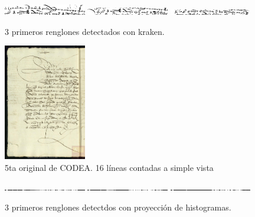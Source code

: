 \documentclass[11pt,a4paper]{article}
\begin{document}
\begin{figure}[H] 
\centering 
\begin{minipage}{1.0\textwidth} 
\includegraphics[width=0.32\textwidth]{4_CODEA_1_kraken.png} 
\includegraphics[width=0.32\textwidth]{4_CODEA_2_kraken.png} 
\includegraphics[width=0.32\textwidth]{4_CODEA_3_kraken.png} 
\caption{3 primeros renglones detectados con kraken.} 
\label{fig:3 líneas kraken 4ta CODEA} 
\end{minipage} 
\end{figure}


\begin{figure}[H] 
\centering 
\begin{minipage}{1.0\textwidth} 
\includegraphics[width=0.32\textwidth]{CODEA-2497_1r.jpg} 
\caption{5ta original de CODEA. 16 líneas contadas a simple vista} 
\label{fig:5ta CODEA} 
\end{minipage} 
\end{figure}

\begin{figure}[H] 
\centering 
\begin{minipage}{1.0\textwidth} 
\includegraphics[width=0.32\textwidth]{5_CODEA_1_PH.png} 
\includegraphics[width=0.32\textwidth]{5_CODEA_2_PH.png} 
\includegraphics[width=0.32\textwidth]{5_CODEA_3_PH.png} 
\caption{3 primeros renglones detectdos con proyección de histogramas.} 
\label{fig:3 líneas PH 5Ta CODEA} 
\end{minipage} 
\end{figure}
\end{document}
